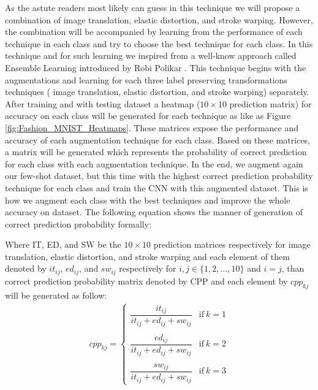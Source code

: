 As the astute readers most likely can guess in this technique we will propose a combination of image
translation, elastic distortion, and stroke warping. However, the combination will be accompanied
by learning from the performance of each technique in each class and try to choose the best
technique for each class. In this technique and for such learning we inspired from a well-know
approach called Ensemble Learning introduced by Robi Polikar \cite{TODO}. This technique begins with the
augmentations and learning for each three label preserving transformations techniques ( image
translation, elastic distortion, and stroke warping) separately. After training and with testing
dataset a heatmap ($10 \times 10$ prediction matrix) for accuracy on each class will be generated
for each technique as like as Figure \ref{fig:Fashion_MNIST_Heatmaps}. These matrices expose the
performance and accuracy of each augmentation technique for each class. Based on these matrices, a
matrix will be generated which represents the probability of correct prediction for each class with
each augmentation technique. In the end, we augment again our few-shot dataset, but this time with
the highest correct prediction probability technique for each class and train the CNN with this
augmented dataset. This is how we augment each class with the best techniques and improve the whole
accuracy on dataset. The following equation shows the manner of generation of correct prediction probability formally:

Where IT, ED, and SW be the $10 \times 10$ prediction matrices respectively for image translation,
elastic distortion, and stroke warping and each element of them denoted by $it_{ij}$, $ed_{ij}$,
and $sw_{ij}$ respectively for $i,j \in \{1,2,...,10\}$ and $i=j$, than correct prediction probability
matrix denoted by CPP and each element by $cpp_{kj}$ will be generated as follow:
\begin{equation}
  \begin{aligned}
    cpp_{kj} =
    \begin{cases}
      \dfrac{it_{ij}}{it_{ij} + ed_{ij} + sw_{ij}} & \text{if}\ k=1 \\ \\
      \dfrac{ed_{ij}}{it_{ij} + ed_{ij} + sw_{ij}} & \text{if}\ k=2 \\ \\
      \dfrac{sw_{ij}}{it_{ij} + ed_{ij} + sw_{ij}} & \text{if}\ k=3
    \end{cases}
  \end{aligned}
\end{equation}

